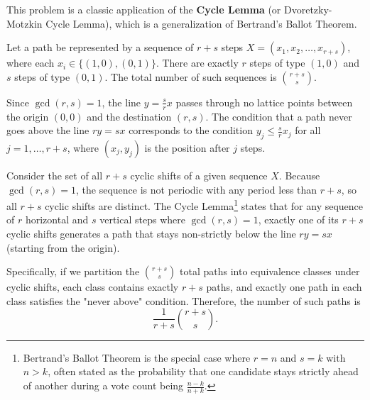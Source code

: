 \begin{solution}
This problem is a classic application of the \textbf{Cycle Lemma} (or Dvoretzky-Motzkin Cycle Lemma), which is a generalization of Bertrand's Ballot Theorem.

Let a path be represented by a sequence of $r+s$ steps $X = (x_1, x_2, \dots, x_{r+s})$, where each $x_i \in \{ (1,0), (0,1) \}$. There are exactly $r$ steps of type $(1,0)$ and $s$ steps of type $(0,1)$. The total number of such sequences is $\binom{r+s}{s}$.

Since $\gcd(r,s)=1$, the line $y = \frac{s}{r}x$ passes through no lattice points between the origin $(0,0)$ and the destination $(r,s)$. The condition that a path never goes above the line $ry=sx$ corresponds to the condition $y_j \leq \frac{s}{r} x_j$ for all $j=1, \dots, r+s$, where $(x_j, y_j)$ is the position after $j$ steps.

Consider the set of all $r+s$ cyclic shifts of a given sequence $X$. Because $\gcd(r,s)=1$, the sequence is not periodic with any period less than $r+s$, so all $r+s$ cyclic shifts are distinct. The Cycle Lemma\footnote{Bertrand's Ballot Theorem is the special case where $r=n$ and $s=k$ with $n > k$, often stated as the probability that one candidate stays strictly ahead of another during a vote count being $\frac{n-k}{n+k}$.} states that for any sequence of $r$ horizontal and $s$ vertical steps where $\gcd(r,s)=1$, exactly one of its $r+s$ cyclic shifts generates a path that stays non-strictly below the line $ry=sx$ (starting from the origin).

Specifically, if we partition the $\binom{r+s}{s}$ total paths into equivalence classes under cyclic shifts, each class contains exactly $r+s$ paths, and exactly one path in each class satisfies the "never above" condition. Therefore, the number of such paths is
\[
\frac{1}{r+s} \binom{r+s}{s}.
\]
\end{solution}

